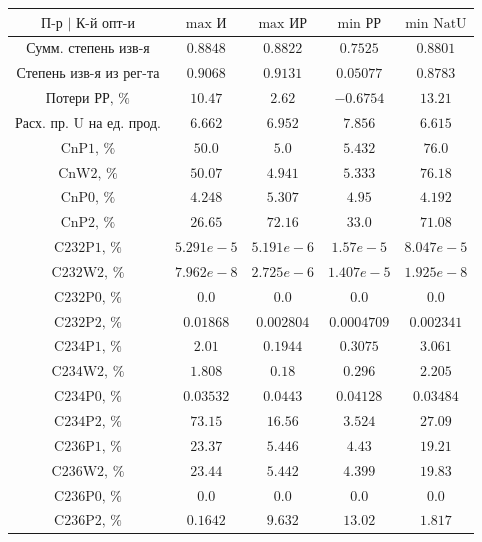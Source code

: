 \begin{table}
    \begin{tabular}{ccccc}
        $\text{П-р | К-й опт-и}$ & $\text{max И}$ & $\text{max ИР}$ & $\text{min РР}$ & $\text{min NatU}$\\ \hline
        $\text{Сумм. степень изв-я}$ & $0.8848$ & $0.8822$ & $0.7525$ & $0.8801$\\ \hline
        $\text{Степень изв-я из рег-та}$ & $0.9068$ & $0.9131$ & $0.05077$ & $0.8783$\\ \hline
        $\text{Потери РР, \%}$ & $10.47$ & $2.62$ & $-0.6754$ & $13.21$\\ \hline
        $\text{Расх. пр. U на ед. прод.}$ & $6.662$ & $6.952$ & $7.856$ & $6.615$\\ \hline
        $\text{CnP1, \%}$ & $50.0$ & $5.0$ & $5.432$ & $76.0$\\ \hline
        $\text{CnW2, \%}$ & $50.07$ & $4.941$ & $5.333$ & $76.18$\\ \hline
        $\text{CnP0, \%}$ & $4.248$ & $5.307$ & $4.95$ & $4.192$\\ \hline
        $\text{CnP2, \%}$ & $26.65$ & $72.16$ & $33.0$ & $71.08$\\ \hline
        $\text{C232P1, \%}$ & $5.291e-5$ & $5.191e-6$ & $1.57e-5$ & $8.047e-5$\\ \hline
        $\text{C232W2, \%}$ & $7.962e-8$ & $2.725e-6$ & $1.407e-5$ & $1.925e-8$\\ \hline
        $\text{C232P0, \%}$ & $0.0$ & $0.0$ & $0.0$ & $0.0$\\ \hline
        $\text{C232P2, \%}$ & $0.01868$ & $0.002804$ & $0.0004709$ & $0.002341$\\ \hline
        $\text{C234P1, \%}$ & $2.01$ & $0.1944$ & $0.3075$ & $3.061$\\ \hline
        $\text{C234W2, \%}$ & $1.808$ & $0.18$ & $0.296$ & $2.205$\\ \hline
        $\text{C234P0, \%}$ & $0.03532$ & $0.0443$ & $0.04128$ & $0.03484$\\ \hline
        $\text{C234P2, \%}$ & $73.15$ & $16.56$ & $3.524$ & $27.09$\\ \hline
        $\text{C236P1, \%}$ & $23.37$ & $5.446$ & $4.43$ & $19.21$\\ \hline
        $\text{C236W2, \%}$ & $23.44$ & $5.442$ & $4.399$ & $19.83$\\ \hline
        $\text{C236P0, \%}$ & $0.0$ & $0.0$ & $0.0$ & $0.0$\\ \hline
        $\text{C236P2, \%}$ & $0.1642$ & $9.632$ & $13.02$ & $1.817$\\ \hline

\end{tabular}
\end{table}
